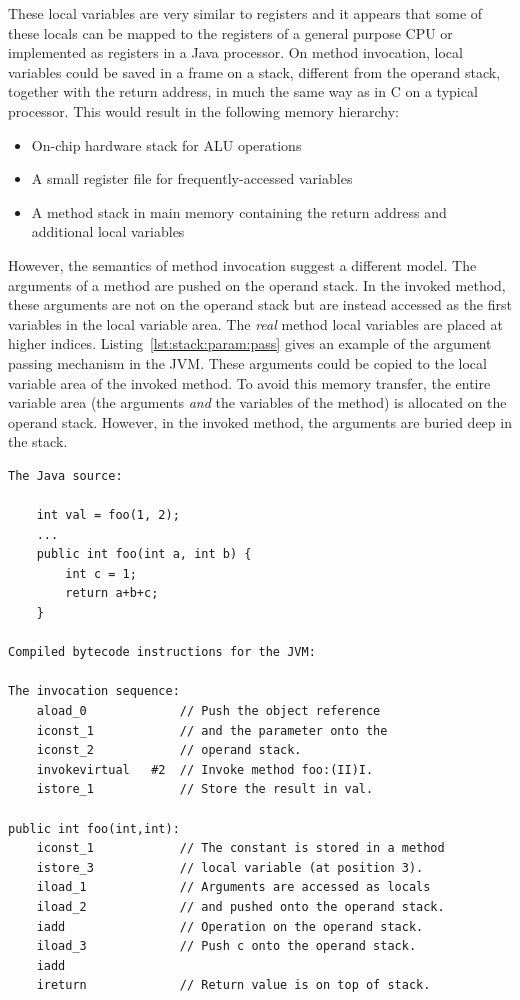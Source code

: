 These local variables are very similar to registers and it appears
that some of these locals can be mapped to the registers of a
general purpose CPU or implemented as registers in a Java processor.
On method invocation, local variables could be saved in a frame on a
stack, different from the operand stack, together with the return
address, in much the same way as in C on a typical processor. This
would result in the following memory hierarchy:
%
\begin{itemize}
\item On-chip hardware stack for ALU operations
\item A small register file for frequently-accessed variables
\item A method stack in main memory containing the return address and additional
local variables
\end{itemize}
%
However, the semantics of method invocation suggest a different
model. The arguments of a method are pushed on the operand stack. In
the invoked method, these arguments are not on the operand stack but
are instead accessed as the first variables in the local variable
area. The \emph{real} method local variables are placed at higher
indices. Listing~\ref{lst:stack:param:pass} gives an example of the
argument passing mechanism in the JVM. These arguments could be
copied to the local variable area of the invoked method. To avoid
this memory transfer, the entire variable area (the arguments
\emph{and} the variables of the method) is allocated on the operand
stack. However, in the invoked method, the arguments are buried deep
in the stack.

\begin{lstlisting}[float,caption={Example of parameter passing and access},label={lst:stack:param:pass}]
The Java source:

    int val = foo(1, 2);
    ...
    public int foo(int a, int b) {
        int c = 1;
        return a+b+c;
    }

Compiled bytecode instructions for the JVM:

The invocation sequence:
    aload_0             // Push the object reference
    iconst_1            // and the parameter onto the
    iconst_2            // operand stack.
    invokevirtual   #2  // Invoke method foo:(II)I.
    istore_1            // Store the result in val.

public int foo(int,int):
    iconst_1            // The constant is stored in a method
    istore_3            // local variable (at position 3).
    iload_1             // Arguments are accessed as locals
    iload_2             // and pushed onto the operand stack.
    iadd                // Operation on the operand stack.
    iload_3             // Push c onto the operand stack.
    iadd
    ireturn             // Return value is on top of stack.
\end{lstlisting}

